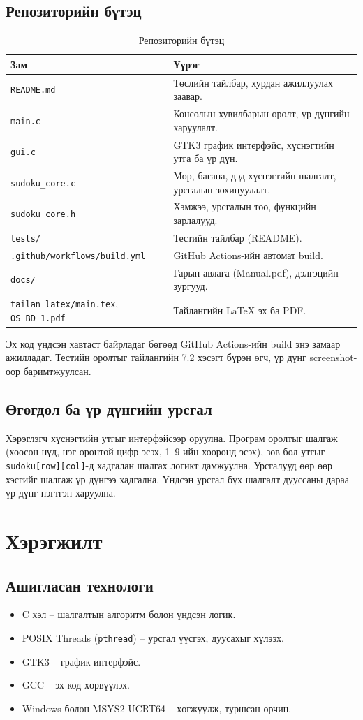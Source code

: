 \documentclass[12pt,a4paper]{report}
\begin{document}
\section{Репозиторийн бүтэц}
\begin{table}[H]\centering\caption{Репозиторийн бүтэц}\begin{tabular}{P{0.38\textwidth}P{0.52\textwidth}}\toprule
\textbf{Зам}&\textbf{Үүрэг}\\\midrule
\texttt{README.md}&Төслийн тайлбар, хурдан ажиллуулах заавар.\\
\texttt{main.c}&Консолын хувилбарын оролт, үр дүнгийн харуулалт.\\
\texttt{gui.c}&GTK3 график интерфэйс, хүснэгтийн утга ба үр дүн.\\
\texttt{sudoku\_core.c}&Мөр, багана, дэд хүснэгтийн шалгалт, урсгалын зохицуулалт.\\
\texttt{sudoku\_core.h}&Хэмжээ, урсгалын тоо, функцийн зарлалууд.\\
\texttt{tests/}&Тестийн тайлбар (README).\\
\texttt{.github/workflows/build.yml}&GitHub Actions-ийн автомат build.\\
\texttt{docs/}&Гарын авлага (Manual.pdf), дэлгэцийн зургууд.\\
\texttt{tailan\_latex/main.tex}, \texttt{OS\_BD\_1.pdf}&Тайлангийн LaTeX эх ба PDF.\\\bottomrule\end{tabular}\end{table}
Эх код үндсэн хавтаст байрладаг бөгөөд GitHub Actions-ийн build энэ замаар ажилладаг. Тестийн оролтыг тайлангийн 7.2 хэсэгт бүрэн өгч, үр дүнг screenshot-оор баримтжуулсан.
\section{Өгөгдөл ба үр дүнгийн урсгал}
Хэрэглэгч хүснэгтийн утгыг интерфэйсээр оруулна. Програм оролтыг шалгаж (хоосон нүд, нэг оронтой цифр эсэх, 1--9-ийн хооронд эсэх), зөв бол утгыг \texttt{sudoku[row][col]}-д хадгалан шалгах логикт дамжуулна. Урсгалууд өөр өөр хэсгийг шалгаж үр дүнгээ хадгална. Үндсэн урсгал бүх шалгалт дууссаны дараа үр дүнг нэгтгэн харуулна.

\chapter{Хэрэгжилт}
\section{Ашигласан технологи}
\begin{itemize}\item C хэл -- шалгалтын алгоритм болон үндсэн логик.\item POSIX Threads (\texttt{pthread}) -- урсгал үүсгэх, дуусахыг хүлээх.\item GTK3 -- график интерфэйс.\item GCC -- эх код хөрвүүлэх.\item Windows болон MSYS2 UCRT64 -- хөгжүүлж, туршсан орчин.\end{itemize}
\end{document}
